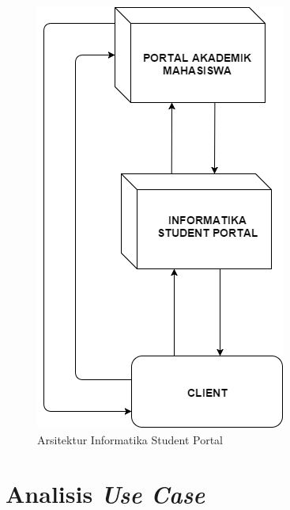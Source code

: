 		\begin{figure}[H]
			\centering
			\includegraphics[scale=0.5]{Gambar/arsitekturIFPortal}
			\caption{Arsitektur Informatika Student Portal} 
			\label{fig:3_ars_portal}
		\end{figure}
		
\section{Analisis \textit{Use Case}}
